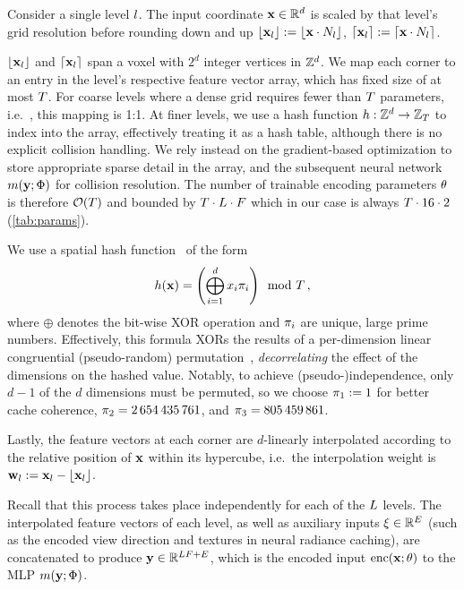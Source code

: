 \documentclass[acmtog,authorversion]{acmart}
\begin{document}
Consider a single level $l$.
The input coordinate $\mathbf{x} \in \mathbb{R}^d$ is scaled by that level's grid resolution before rounding down and up $\lfloor \mathbf{x}_l\rfloor := \lfloor \mathbf{x} \cdot N_l \rfloor$, $\lceil \mathbf{x}_l\rceil := \lceil \mathbf{x} \cdot N_l \rceil$.

${\lfloor \mathbf{x}_l\rfloor}$ and ${\lceil \mathbf{x}_l\rceil}$ span a voxel with $2^d$ integer vertices in $\mathbb{Z}^d$. 
We map each corner to an entry in the level's respective feature vector array, which has fixed size of at most $T$.
For coarse levels where a dense grid requires fewer than $T$ parameters, i.e.\ , this mapping is 1:1.
At finer levels, we use a hash function ${h : \mathbb{Z}^d \rightarrow \mathbb{Z}_T}$ to index into the array, effectively treating it as a hash table, although there is no explicit collision handling.
We rely instead on the gradient-based optimization to store appropriate sparse detail in the array, and the subsequent neural network $m(\mathbf{y}; \Phi)$ for collision resolution.
The number of trainable encoding parameters $\theta$ is therefore $\mathcal{O}(T)$ and bounded by ${T \cdot L \cdot F}$ which in our case is always ${T \cdot 16 \cdot 2}$ (\autoref{tab:params}).

We use a spatial hash function~\cite{SpatialHash:03} of the form
\begin{equation} \label{Eqn:HashFunc}
  h(\pos) = \left(\bigoplus_{i=1}^{d} x_i \primeNumber_i \right) \mod \entriesPerLevel \,,
\end{equation}
where $\oplus$ denotes the bit-wise XOR operation and $\pi_i$ are unique, large prime numbers.
Effectively, this formula XORs the results of a per-dimension linear congruential (pseudo-random) permutation~\citep{Lehm51}, \emph{decorrelating} the effect of the dimensions on the hashed value.
Notably, to achieve (pseudo-)independence, only ${d-1}$ of the $d$ dimensions must be permuted, so we choose ${\pi_1 := 1}$ for better cache coherence, ${\pi_2 = \num{2654435761}}$, and ${\pi_3 = \num{805459861}}$.

Lastly, the feature vectors at each corner are $d$-linearly interpolated according to the relative position of $\mathbf{x}$ within its hypercube, i.e.\ the interpolation weight is $\mathbf{w}_l := \mathbf{x}_l - \lfloor \mathbf{x}_l\rfloor$.

Recall that this process takes place independently for each of the $L$ levels.
The interpolated feature vectors of each level, as well as auxiliary inputs ${\mathbf{\xi} \in \mathbb{R}^E}$ (such as the encoded view direction and textures in neural radiance caching), are concatenated to produce ${\mathbf{y} \in \mathbb{R}^{LF + E}}$, which is the encoded input $\mathrm{enc}(\mathbf{x}; \theta)$ to the MLP $m(\mathbf{y}; \Phi)$.
\end{document}
